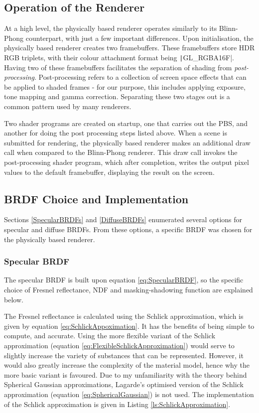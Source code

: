 \subsection{Operation of the Renderer}

At a high level, the physically based renderer operates similarly to its Blinn-Phong counterpart, with just a few important differences. Upon initialisation, the physically based renderer creates two framebuffers. These framebuffers store HDR RGB triplets, with their colour attachment format being \texttt|GL_RGBA16F|. Having two of these framebuffers facilitates the separation of shading from \textit{post-processing}. Post-processing refers to a collection of screen space effects that can be applied to shaded frames - for our purpose, this includes applying exposure, tone mapping and gamma correction. Separating these two stages out is a common pattern used by many renderers.

Two shader programs are created on startup, one that carries out the PBS, and another for doing the post processing steps listed above. When a scene is submitted for rendering, the physically based renderer makes an additional draw call when compared to the Blinn-Phong renderer. This draw call invokes the post-processing shader program, which after completion, writes the output pixel values to the default framebuffer, displaying the result on the screen.

\subsection{BRDF Choice and Implementation} \label{BRDFChoiceAndImplementation}

Sections \ref{SpecularBRDFs} and \ref{DiffuseBRDFs} enumerated several options for specular and diffuse BRDFs. From these options, a specific BRDF was chosen for the physically based renderer.

\subsubsection{Specular BRDF}

The specular BRDF is built upon equation \ref{eq:SpecularBRDF}, so the specific choice of Fresnel reflectance, NDF and masking-shadowing function are explained below.

The Fresnel reflectance is calculated using the Schlick approximation, which is given by equation \ref{eq:SchlickAppoximation}. It has the benefits of being simple to compute, and accurate. Using the more flexible variant of the Schlick approximation (equation \ref{eq:FlexibleSchlickApproximation}) would serve to slightly increase the variety of substances that can be represented. However, it would also greatly increase the complexity of the material model, hence why the more basic variant is favoured. Due to my unfamiliarity with the theory behind Spherical Gaussian approximations, Lagarde's optimised version of the Schlick approximation (equation \ref{eq:SphericalGaussian}) is not used. The implementation of the Schlick approximation is given in Listing \ref{ls:SchlickApproximation}.


